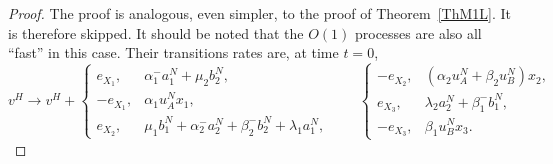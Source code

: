 \documentclass[english]{amsart}
\numberwithin{proposition}{section}
\begin{document}
\begin{proof}
The proof is analogous, even simpler, to the proof of Theorem~\ref{ThM1L}. It is therefore skipped. 
It should be noted that the $O(1)$ processes are also all ``fast''  in this case. Their transitions rates are, at time $t{=}0$,
\[
v^H\longrightarrow v^H{+}
\begin{cases}
\scriptstyle{e_{X_1}}, & \scriptstyle{\alpha_1^-a_1^N+\mu_2b_2^N},\\
\scriptstyle{{-}e_{X_1}}, &\scriptstyle{\alpha_1u_A^Nx_1},\\
\scriptstyle{e_{X_2}}, &\scriptstyle{\mu_1b_1^N{+}\alpha_2^-a_2^N{+}\beta_2^-b_2^N{+}\lambda_1a_1^N},
    \end{cases}\qquad 
    \begin{cases}
      \scriptstyle{{-}e_{X_2}}, &\scriptstyle{\left(\alpha_2u_A^N{+}\beta_2u_B^N\right)x_2},\\
\scriptstyle{e_{X_3}}, &\scriptstyle{\lambda_2a_2^N{+}\beta_1^-b_1^N},\\
\scriptstyle{{-}e_{X_3}}, & \scriptstyle{\beta_1u_B^Nx_3}.
\end{cases}
\]
\end{proof}
\end{document}
